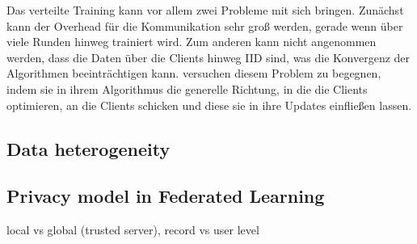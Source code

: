 Das verteilte Training kann vor allem zwei Probleme mit sich bringen. Zunächst kann der Overhead für die Kommunikation sehr groß werden, gerade wenn über viele Runden hinweg trainiert wird. Zum anderen kann nicht angenommen werden, dass die Daten über die Clients hinweg IID sind, was die Konvergenz der Algorithmen beeinträchtigen kann. \textcite{karimireddy:2020} versuchen diesem Problem zu begegnen, indem sie in ihrem Algorithmus die generelle Richtung, in die die Clients optimieren, an die Clients schicken und diese sie in ihre Updates einfließen lassen.

\subsection{Data heterogeneity}

\subsection{Privacy model in Federated Learning}
local vs global (trusted server), record vs user level
